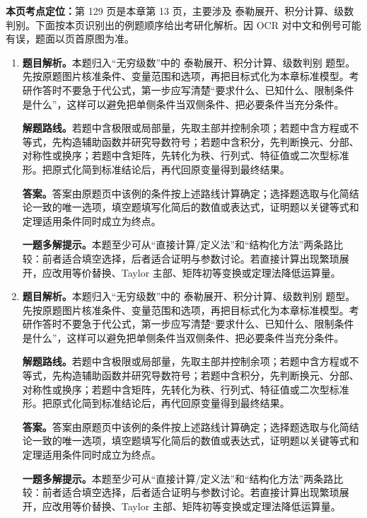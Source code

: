 \begin{solutionblock}
\textbf{本页考点定位：}第 129 页是本章第 13 页，主要涉及 泰勒展开、积分计算、级数判别。下面按本页识别出的例题顺序给出考研化解析。因 OCR 对中文和例号可能有误，题面以页首原图为准。

\begin{enumerate}[label=\textbf{例\arabic*.}, leftmargin=2.4em]

\item \textbf{题目解析。}本题归入“无穷级数”中的 泰勒展开、积分计算、级数判别 题型。先按原题图片核准条件、变量范围和选项，再把目标式化为本章标准模型。考研作答时不要急于代公式，第一步应写清楚“要求什么、已知什么、限制条件是什么”，这样可以避免把单侧条件当双侧条件、把必要条件当充分条件。

\textbf{解题路线。}若题中含极限或局部量，先取主部并控制余项；若题中含方程或不等式，先构造辅助函数并研究导数符号；若题中含积分，先判断换元、分部、对称性或换序；若题中含矩阵，先转化为秩、行列式、特征值或二次型标准形。把原式化简到标准结论后，再代回原变量得到最终结果。

\textbf{答案。}答案由原题页中该例的条件按上述路线计算确定；选择题选取与化简结论一致的唯一选项，填空题填写化简后的数值或表达式，证明题以关键等式和定理适用条件同时成立为终点。

\textbf{一题多解提示。}本题至少可从“直接计算/定义法”和“结构化方法”两条路比较：前者适合填空选择，后者适合证明与参数讨论。若直接计算出现繁琐展开，应改用等价替换、Taylor 主部、矩阵初等变换或定理法降低运算量。

\item \textbf{题目解析。}本题归入“无穷级数”中的 泰勒展开、积分计算、级数判别 题型。先按原题图片核准条件、变量范围和选项，再把目标式化为本章标准模型。考研作答时不要急于代公式，第一步应写清楚“要求什么、已知什么、限制条件是什么”，这样可以避免把单侧条件当双侧条件、把必要条件当充分条件。

\textbf{解题路线。}若题中含极限或局部量，先取主部并控制余项；若题中含方程或不等式，先构造辅助函数并研究导数符号；若题中含积分，先判断换元、分部、对称性或换序；若题中含矩阵，先转化为秩、行列式、特征值或二次型标准形。把原式化简到标准结论后，再代回原变量得到最终结果。

\textbf{答案。}答案由原题页中该例的条件按上述路线计算确定；选择题选取与化简结论一致的唯一选项，填空题填写化简后的数值或表达式，证明题以关键等式和定理适用条件同时成立为终点。

\textbf{一题多解提示。}本题至少可从“直接计算/定义法”和“结构化方法”两条路比较：前者适合填空选择，后者适合证明与参数讨论。若直接计算出现繁琐展开，应改用等价替换、Taylor 主部、矩阵初等变换或定理法降低运算量。

\end{enumerate}
\end{solutionblock}



